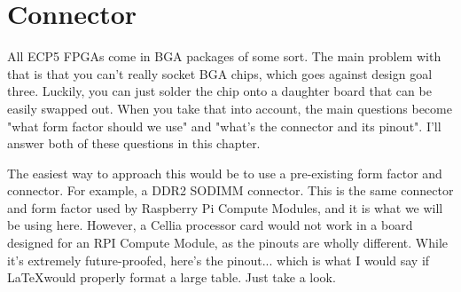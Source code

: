 \documentclass[letterpaper,12pt]{book}
\begin{document}
\chapter{Connector}

All ECP5 FPGAs come in BGA packages of some sort. The main problem with that is that you can't really socket BGA chips, which goes against design goal three. Luckily, you can just solder the chip onto a daughter board that can be easily swapped out. When you take that into account, the main questions become "what form factor should we use" and "what's the connector and its pinout". I'll answer both of these questions in this chapter.

The easiest way to approach this would be to use a pre-existing form factor and connector. For example, a DDR2 SODIMM connector. This is the same connector and form factor used by Raspberry Pi Compute Modules, and it is what we will be using here. However, a Cellia processor card would not work in a board designed for an RPI Compute Module, as the pinouts are wholly different. While it's extremely future-proofed, here's the pinout... which is what I would say if \LaTeX would properly format a large table. Just take a look.
\end{document}
